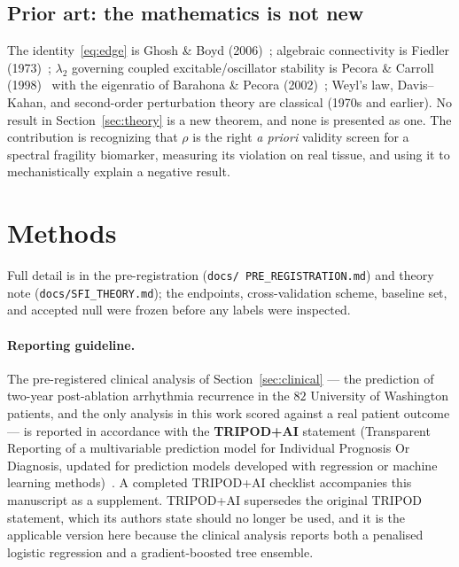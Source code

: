 \documentclass[11pt]{article}
\theoremstyle{definition}
\newcommand{\lam}{\lambda}
\newcommand{\rhoval}{\rho}
\newcommand{\code}[1]{\texttt{#1}}
\begin{document}
\subsection{Prior art: the mathematics is not new}
\label{sec:credits}
The identity~\eqref{eq:edge} is Ghosh \& Boyd (2006)~\cite{ghosh2006}; algebraic
connectivity is Fiedler (1973)~\cite{fiedler1973}; $\lam_2$ governing coupled
excitable/oscillator stability is Pecora \& Carroll
(1998)~\cite{pecora1998} with the eigenratio of Barahona \& Pecora
(2002)~\cite{barahona2002}; Weyl's law, Davis--Kahan, and second-order
perturbation theory are classical (1970s and earlier). No result in
Section~\ref{sec:theory} is a new theorem, and none is presented as one. The
contribution is recognizing that $\rhoval$ is the right \emph{a priori}
validity screen for a spectral fragility biomarker, measuring its violation on
real tissue, and using it to mechanistically explain a negative result.

\section{Methods}
\label{sec:methods}
Full detail is in the pre-registration (\code{docs/\allowbreak
PRE\_REGISTRATION.md}) and
theory note (\code{docs/\allowbreak SFI\_THEORY.md}); the endpoints,
cross-validation scheme,
baseline set, and accepted null were frozen before any labels were inspected.

\paragraph{Reporting guideline.} The pre-registered clinical analysis of
Section~\ref{sec:clinical} --- the prediction of two-year post-ablation
arrhythmia recurrence in the $82$ University of Washington patients, and the
only analysis in this work scored against a real patient outcome --- is
reported in accordance with the \textbf{TRIPOD+AI} statement (Transparent
Reporting of a multivariable prediction model for Individual Prognosis Or
Diagnosis, updated for prediction models developed with regression or machine
learning methods)~\cite{tripodai2024}. A completed TRIPOD+AI checklist
accompanies this manuscript as a supplement. TRIPOD+AI supersedes the original
TRIPOD statement, which its authors state should no longer be used, and it is
the applicable version here because the clinical analysis reports both a
penalised logistic regression and a gradient-boosted tree ensemble.
\end{document}
